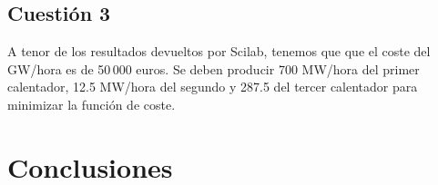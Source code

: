 \documentclass[12pt,a4paper,twoside,openright,titlepage,final]{article}
\begin{document}
\subsection{Cuestión 3}

A tenor de los resultados devueltos por Scilab, tenemos que que el coste del GW/hora es de 50\,000 euros. Se deben producir 700 MW/hora del primer calentador, 12.5 MW/hora del segundo y 287.5 del tercer calentador para minimizar la función de coste.\\



\section{Conclusiones}
\end{document}
